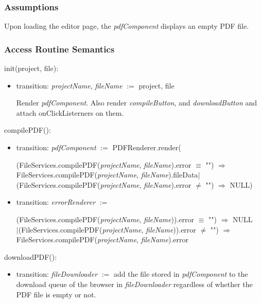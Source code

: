 \documentclass[12pt, titlepage]{article}
\begin{document}
	\subsubsection{Assumptions}
	
	Upon loading the editor page, the \textit{pdfComponent} displays an empty PDF file.
	
	\subsubsection{Access Routine Semantics}
	
	\noindent init(project, file):
	\begin{itemize}
		\item transition: \textit{projectName}, \textit{fileName} $:=$ project, file
		
		\noindent Render \textit{pdfComponent}. Also render \textit{compileButton}, and \textit{downloadButton} and attach onClickListerners on them. 
	\end{itemize}
	
	\noindent compilePDF():
	\begin{itemize}
		\item transition: \textit{pdfComponent} $:=$ PDFRenderer.render(
		
		(FileServices.compilePDF(\textit{projectName}, \textit{fileName}).error $\equiv$ "") $\Rightarrow$\\
		FileServices.compilePDF(\textit{projectName}, \textit{fileName}).fileData$|$\\
		(FileServices.compilePDF(\textit{projectName}, \textit{fileName}).error $\neq$ "") $\Rightarrow$ NULL)
		
		\item transition: \textit{errorRenderer} $:=$
		
		(FileServices.compilePDF(\textit{projectName}, \textit{fileName})).error $\equiv$ "") $\Rightarrow$ NULL\\
		$|$(FileServices.compilePDF(\textit{projectName}, \textit{fileName})).error $\neq$ "") $\Rightarrow$\\
		FileServices.compilePDF(\textit{projectName}, \textit{fileName}).error
	\end{itemize}
	
	\noindent downloadPDF():
	\begin{itemize}
		\item transition: \textit{fileDownloader} $:=$ add the file stored in \textit{pdfComponent} to the download queue of the browser in \textit{fileDownloader} regardless of whether the PDF file is empty or not.
	\end{itemize}
	
\end{document}
